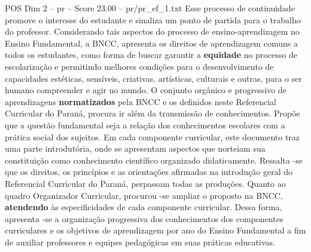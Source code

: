 \begin{textsample}{POS Dim 2 – pr – Score 23.00 – pr/pr\_ef\_1.txt}
Esse processo de continuidade promove o interesse do estudante e sinaliza um ponto de partida para o trabalho do professor.
Considerando tais aspectos do processo de ensino-aprendizagem no Ensino Fundamental, a BNCC, apresenta os direitos de aprendizagem comuns a todos os estudantes, como forma de buscar garantir a \textbf{equidade} no processo de escolarização e permitindo melhores condições para o desenvolvimento de capacidades estéticas, sensíveis, criativas, artísticas, culturais e outras, para o ser humano compreender e agir no mundo.
O conjunto orgânico e progressivo de aprendizagens \textbf{normatizados} pela BNCC e os definidos neste Referencial Curricular do Paraná, procura ir além da transmissão de conhecimentos.
Propõe que a questão fundamental seja a relação dos conhecimentos escolares com a prática social dos sujeitos.
Em cada componente curricular, este documento traz uma parte introdutória, onde se apresentam aspectos que norteiam sua constituição como conhecimento científico organizado didaticamente.
Ressalta -se que os direitos, os princípios e as orientações afirmadas na introdução geral do Referencial Curricular do Paraná, perpassam todas as produções.
Quanto ao quadro Organizador Curricular, procurou -se ampliar o proposto na BNCC, \textbf{atendendo} às especificidades de cada componente curricular.
Dessa forma, apresenta -se a organização progressiva dos conhecimentos dos componentes curriculares e os objetivos de aprendizagem por ano do Ensino Fundamental a fim de auxiliar professores e equipes pedagógicas em suas práticas educativas.

\end{textsample}

